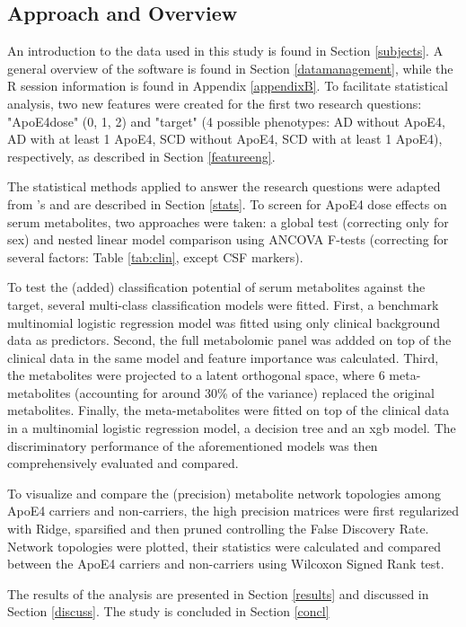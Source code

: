 \documentclass{amsart}
\begin{document}
\subsection{Approach and Overview}
An introduction to the data used in this study is found in Section \ref{subjects}. A general overview of the software is found in Section \ref{datamanagement}, while the R session information is found in Appendix \ref{appendixB}. To facilitate statistical analysis, two new features were created for the first two research questions: "ApoE4dose" (0, 1, 2) and "target" (4 possible phenotypes: AD without ApoE4, AD with at least 1 ApoE4, SCD without ApoE4, SCD with at least 1 ApoE4), respectively, as described in Section \ref{featureeng}.

The statistical methods applied to answer the research questions were adapted from \citeauthor{deLeeuw2017Blood-basedDisease}'s  and are described in Section \ref{stats}. To screen for ApoE4 dose effects on serum metabolites, two approaches were taken: a global test (correcting only for sex) and nested linear model comparison using ANCOVA F-tests (correcting for several factors: Table \ref{tab:clin}, except CSF markers). 

To test the (added) classification potential of serum metabolites against the target, several multi-class classification models were fitted. First, a benchmark multinomial logistic regression model was fitted using only clinical background data as predictors. Second, the full metabolomic panel was addded on top of the clinical data in the same model and feature importance was calculated. Third, the metabolites were projected to a latent orthogonal space, where 6 meta-metabolites (accounting for around 30\% of the variance) replaced the original metabolites. Finally, the meta-metabolites were fitted on top of the clinical data in a multinomial logistic regression model, a decision tree and an \acrfull{xgb} model. The discriminatory performance of the aforementioned models was then comprehensively evaluated and compared.

To visualize and compare the (precision) metabolite network topologies among ApoE4 carriers and non-carriers, the high precision matrices were first regularized with Ridge, sparsified and then pruned controlling the False Discovery Rate. Network topologies were plotted, their statistics were calculated and compared between the ApoE4 carriers and non-carriers using Wilcoxon Signed Rank test.

The results of the analysis are presented in Section \ref{results} and discussed in Section \ref{discuss}. The study is concluded in Section \ref{concl}
\end{document}
